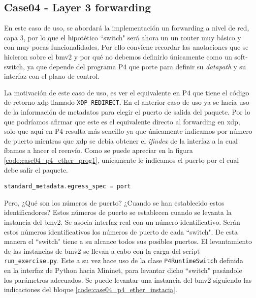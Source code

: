 \subsection{Case04 - Layer 3 forwarding}
\label{P4_ether_case04}

En este caso de uso, se abordará la implementación un forwarding a nivel de red, capa 3, por lo que el hipotético ``switch" será ahora un un router muy básico y con muy pocas funcionalidades. Por ello conviene recordar las anotaciones que se hicieron sobre el \gls{bmv2} y por qué no debemos definirlo únicamente como un soft-switch, ya que depende del programa P4 que porte para definir su \textit{datapath} y su interfaz con el plano de control.\\
\par

La motivación de este caso de uso, es ver el equivalente en P4 que tiene el código de retorno \gls{xdp} llamado \texttt{XDP\_REDIRECT}. En el anterior caso de uso ya se hacía uso de la información de metadatos para elegir el puerto de salida del paquete. Por lo que podríamos afirmar que este es el equivalente directo al forwarding en \gls{xdp}, solo que aquí en P4 resulta más sencillo ya que únicamente indicamos por número de puerto mientras que \gls{xdp} se debía obtener el \textit{ifindex} de la interfaz a la cual íbamos a hacer el reenvío. Como se puede apreciar en la figura \ref{code:case04_p4_ether_prog1}, unicamente le indicamos el puerto por el cual debe salir el paquete.\\
\par

\begin{lstlisting}[language=C, style=P4-color, caption={Redirección del paquete - Case04},label=code:case04_p4_ether_prog1]
    standard_metadata.egress_spec = port
\end{lstlisting}
\vspace{0.5cm}

Pero, ¿Qué son los números de puerto? ¿Cuando se han establecido estos identificadores? Estos números de puerto se establecen cuando se levanta la instancia del \gls{bmv2}. Se asocia interfaz real con un número identificativo. Serán estos números identificativos los números de puerto de cada ``switch". De esta manera el ``switch" tiene a su alcance todos sus posibles puertos. El levantamiento de las instancias de \gls{bmv2} se llevan a cabo con la carga del script \texttt{run\_exercise.py}. Este a su vez hace uso de la clase \texttt{P4RuntimeSwitch} definida en la interfaz de Python hacia Mininet,  para levantar dicho ``switch" pasándole los parámetros adecuados. Se puede levantar una instancia del \gls{bmv2} siguiendo las indicaciones del bloque \ref{code:case04_p4_ether_instacia}.\\
\par

